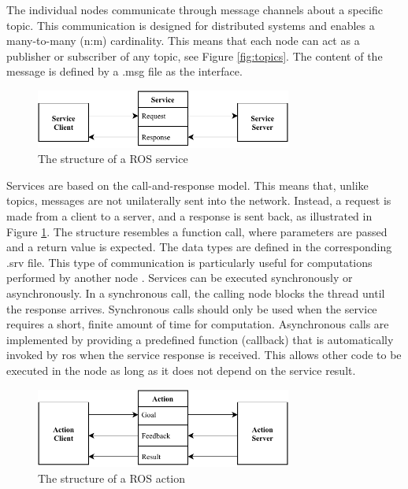 The individual nodes communicate through message channels about a specific topic. This communication is designed for distributed systems and enables a many-to-many (n:m) cardinality. This means that each node can act as a publisher or subscriber of any topic, see Figure \ref{fig:topics}. The content of the message is defined by a .msg file as the interface.

\begin{figure}[h]
    \centering
    \includegraphics[width=0.75\textwidth]{figures/02_state_of_the_art/services.pdf}
    \caption{The structure of a ROS service}
    \label{fig:services}
\end{figure}

Services are based on the call-and-response model. This means that, unlike topics, messages are not unilaterally sent into the network. Instead, a request is made from a client to a server, and a response is sent back, as illustrated in Figure \ref{fig:services}. The structure resembles a function call, where parameters are passed and a return value is expected. The data types are defined in the corresponding .srv file. This type of communication is particularly useful for computations performed by another node \cite[p. 51]{quigley_programming_2015}. Services can be executed synchronously or asynchronously. In a synchronous call, the calling node blocks the thread until the response arrives. Synchronous calls should only be used when the service requires a short, finite amount of time for computation. Asynchronous calls are implemented by providing a predefined function (callback) that is automatically invoked by \gls{ros} when the service response is received. This allows other code to be executed in the node as long as it does not depend on the service result.

\begin{figure}[h]
    \centering
    \includegraphics[width=0.75\textwidth]{figures/02_state_of_the_art/actions.pdf}
    \caption{The structure of a ROS action}
    \label{fig:actions}
\end{figure}


